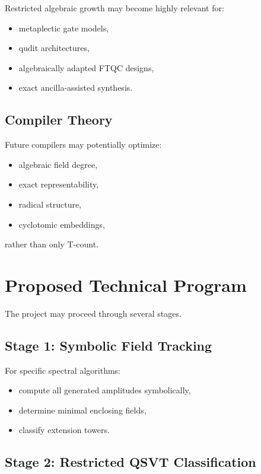 \documentclass[12pt,a4paper]{article}
\begin{document}
Restricted algebraic growth may become highly relevant for:

\begin{itemize}
    \item metaplectic gate models,
    \item qudit architectures,
    \item algebraically adapted FTQC designs,
    \item exact ancilla-assisted synthesis.
\end{itemize}

\subsection{Compiler Theory}

Future compilers may potentially optimize:

\begin{itemize}
    \item algebraic field degree,
    \item exact representability,
    \item radical structure,
    \item cyclotomic embeddings,
\end{itemize}

rather than only T-count.


\section{Proposed Technical Program}

The project may proceed through several stages.

\subsection{Stage 1: Symbolic Field Tracking}

For specific spectral algorithms:

\begin{itemize}
    \item compute all generated amplitudes symbolically,
    \item determine minimal enclosing fields,
    \item classify extension towers.
\end{itemize}

\subsection{Stage 2: Restricted QSVT Classification}
\end{document}
